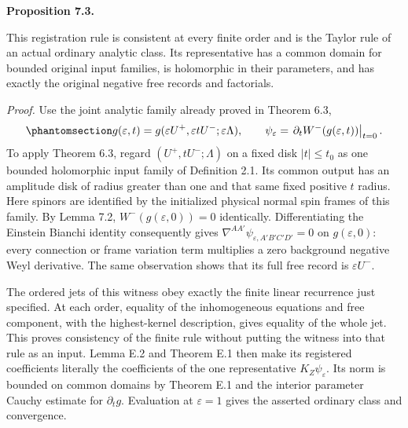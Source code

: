 \documentclass[
  english,
  11pt,
  reqno]{amsart}
\makeatletter
\newcommand{\pandocstatementheading}[1]{%
  \par\addpenalty{\@beginparpenalty}%
  \addvspace{.5\baselineskip plus .2\baselineskip minus .2\baselineskip}%
  {\normalfont\bfseries #1\par}%
  \nobreak\@afterindenttrue\@afterheading
}
\makeatother
\begin{document}
\pandocstatementheading{\protect{}\label{prop:gg-negative-registration-convergence}Proposition 7.3.}

This registration rule is consistent at every finite order and is the
Taylor rule of an actual ordinary analytic class. Its representative has
a common domain for bounded original input families, is holomorphic in
their parameters, and has exactly the original negative free records and
factorials.

\emph{Proof.} Use the joint analytic family already proved in Theorem
6.3,
\begin{equation}\protect\phantomsection\label{eq:gg-negative-registration-witness}{
 g(\varepsilon,t)=g(\varepsilon U^+,\varepsilon tU^-;\varepsilon\Lambda),
 \qquad
 \psi_\varepsilon=
 \left.\partial_t W^-\!\left(g(\varepsilon,t)\right)\right|_{t=0}.
}\end{equation} To apply Theorem 6.3, regard \((U^+,tU^-;\Lambda)\) on a
fixed disk \(|t|\le t_0\) as one bounded holomorphic input family of
Definition 2.1. Its common output has an amplitude disk of radius
greater than one and that same fixed positive \(t\) radius. Here spinors
are identified by the initialized physical normal spin frames of this
family. By Lemma 7.2, \(W^-(g(\varepsilon,0))=0\) identically.
Differentiating the Einstein Bianchi identity consequently gives
\(\nabla^{AA'}\psi_{\varepsilon,A'B'C'D'}=0\) on \(g(\varepsilon,0)\):
every connection or frame variation term multiplies a zero background
negative Weyl derivative. The same observation shows that its full free
record is \(\varepsilon U^-\).

The ordered jets of this witness obey exactly the finite linear
recurrence just specified. At each order, equality of the inhomogeneous
equations and free component, with the highest-kernel description, gives
equality of the whole jet. This proves consistency of the finite rule
without putting the witness into that rule as an input. Lemma E.2 and
Theorem E.1 then make its registered coefficients literally the
coefficients of the one representative \(K_Z\psi_\varepsilon\). Its norm
is bounded on common domains by Theorem E.1 and the interior parameter
Cauchy estimate for \(\partial_tg\). Evaluation at \(\varepsilon=1\)
gives the asserted ordinary class and convergence.
\end{document}
